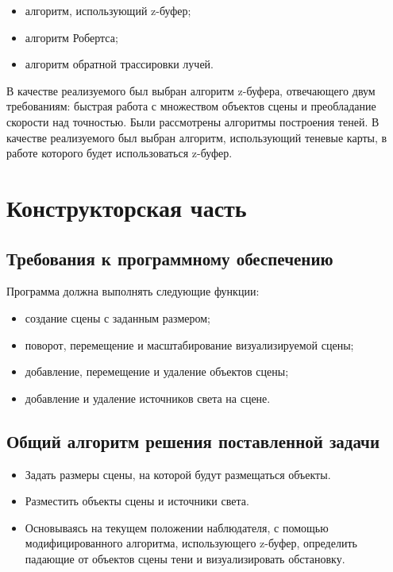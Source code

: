 \documentclass[a4paper,14pt, unknownkeysallowed]{extreport}
\begin{document}
\begin{itemize}
	\item алгоритм, использующий z-буфер;
	\item алгоритм Робертса;
	\item алгоритм обратной трассировки лучей.
\end{itemize}

В качестве реализуемого был выбран алгоритм z-буфера, отвечающего двум требованиям: быстрая работа с множеством объектов сцены и преобладание скорости над точностью. Были рассмотрены алгоритмы построения теней. В качестве реализуемого был выбран алгоритм, использующий теневые карты, в работе которого будет использоваться z-буфер.

\chapter{Конструкторская часть}

\section{Требования к программному обеспечению}

Программа должна выполнять следующие функции:

\begin{itemize}
	\item создание сцены с заданным размером;
	\item поворот, перемещение и масштабирование визуализируемой сцены;
	\item добавление, перемещение и удаление объектов сцены;
	\item добавление и удаление источников света на сцене.
\end{itemize}

\section{Общий алгоритм решения поставленной задачи}

\begin{itemize}
	\item Задать размеры сцены, на которой будут размещаться объекты.
	\item Разместить объекты сцены и источники света.
	\item Основываясь на текущем положении наблюдателя, с помощью модифицированного алгоритма, использующего z-буфер, определить падающие от объектов сцены тени и визуализировать обстановку.
\end{itemize}
\end{document}
